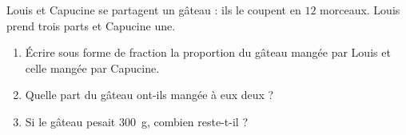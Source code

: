 
\begin{exercice}\label{exo2smath-0065}

Louis et Capucine se partagent un gâteau : ils le coupent en \( 12\) morceaux. Louis prend trois parts et Capucine une.
\begin{enumerate}
    \item
        Écrire sous forme de fraction la proportion du gâteau mangée par Louis et celle mangée par Capucine.
    \item
 Quelle part du gâteau ont-ils mangée à eux deux ?
 \item
     Si le gâteau pesait \SI{300}{\gram}, combien reste-t-il ?
\end{enumerate}


\end{exercice}

